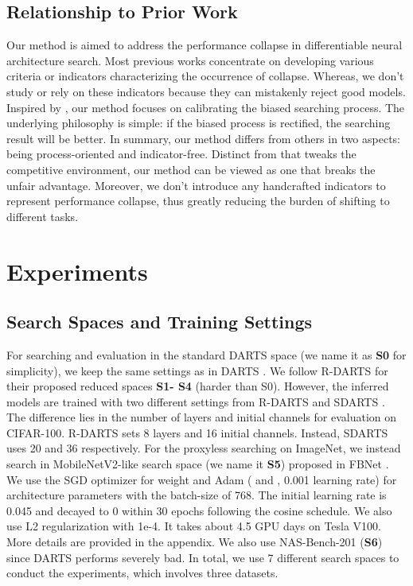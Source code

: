 \documentclass{article} \usepackage{iclr2021_conference,times}
\begin{document}
\subsection{Relationship to Prior Work}
Our  method is aimed to address the performance collapse in differentiable neural architecture search. Most previous works \citep{zela2020understanding,chen2020stabilizing,liang2019darts} concentrate on developing various criteria or indicators characterizing the occurrence of collapse. Whereas, we don't study or rely on these indicators because they can mistakenly reject good models. Inspired by \cite{chu2019fair}, our method focuses on calibrating the biased searching process. The underlying philosophy is simple: if the biased process is rectified, the searching result will be better.  In summary, our method differs from others in two aspects: being process-oriented and indicator-free. Distinct from \cite{chu2019fair} that tweaks the competitive environment, our method can be viewed as one that breaks the unfair advantage. 
Moreover, we don't introduce any handcrafted indicators to represent performance collapse, thus greatly reducing the burden of shifting to different tasks.



\section{Experiments} \label{sec:exp}

\subsection{Search Spaces and Training Settings}\label{sec: training setting}

For searching and evaluation in the standard DARTS space (we name it as \textbf{S0} for simplicity), we keep the same settings as in DARTS \citep{liu2018darts}. We follow R-DARTS \citep{zela2020understanding} for their proposed reduced spaces \textbf{S1- S4} (harder than S0). However, the inferred models are trained with two different settings from R-DARTS \citep{zela2020understanding} and SDARTS \citep{chen2020stabilizing}. The difference lies in the number of layers and initial channels for evaluation on CIFAR-100. R-DARTS sets 8 layers and 16 initial channels. Instead, SDARTS uses 20 and 36 respectively. For the proxyless searching on ImageNet, we instead search in MobileNetV2-like search space (we name it \textbf{S5}) proposed in FBNet \citep{wu2018fbnet}. We use the SGD optimizer for weight  and Adam ( and , 0.001 learning rate) for architecture parameters with the batch-size of 768. The initial learning rate is 0.045 and decayed to 0 within 30 epochs following the cosine schedule.  We also use L2 regularization with 1e-4.  It takes about 4.5 GPU days on Tesla V100.  More details are provided in the appendix.  We also use NAS-Bench-201 (\textbf{S6}) since DARTS performs severely bad. In total, we use 7 different search spaces to conduct the experiments, which involves three datasets.
\end{document}
